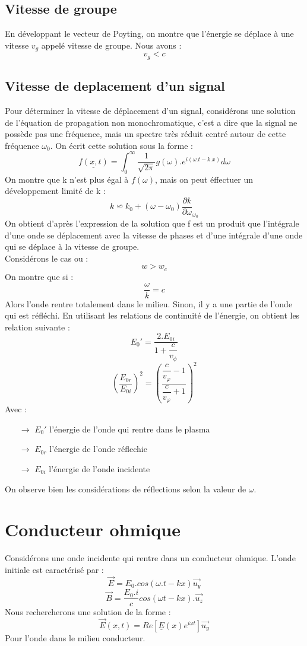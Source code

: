 \subsection{Vitesse de groupe}
En développant le vecteur de Poyting, on montre que l'énergie se déplace à une vitesse $v_g$ appelé vitesse de groupe. Nous avons : 
$$v_g < c$$
\subsection{Vitesse de deplacement d'un signal}
Pour déterminer la vitesse de déplacement d'un signal, considérons une solution de l'équation de propagation non monochromatique, c'est a dire que la signal ne possède pas une fréquence, mais un spectre très réduit centré autour de cette fréquence $\omega_0$. On écrit cette solution sous la forme : 
$$\underline{f(x,t)} = \int_0^{\infty} \dfrac{1}{\sqrt{2\pi}} g(\omega).e^{i(\omega.t-k.x)}d\omega $$
On montre que k n'est plus égal à $f(\omega)$, mais on peut éffectuer un développement limité de k : 
$$k \backsimeq k_0 + (\omega - \omega_0)\dfrac{\partial k}{\partial \omega}_{\omega_0}$$ 
On obtient d'après l'expression de la solution que f est un produit que l'intégrale d'une onde se déplacement avec la vitesse de phases et d'une intégrale d'une onde qui se déplace à la vitesse de groupe.\\
Considérons le cas ou : 
$$w > w_c$$
On montre que si :
$$\dfrac{\omega}{k} = c$$
Alors l'onde rentre totalement dans le milieu. Sinon, il y a une partie de l'onde qui est réfléchi. En utilisant les relations de continuité de l'énergie, on obtient les relation suivante :
$$E_0' = \dfrac{2.E_{0i}}{1 + \dfrac{c}{v_{\phi}}}$$
$$\left(\dfrac{E_{0r}}{E_{0i}}\right)^2 = \left(\dfrac{\dfrac{c}{v_{\varphi}} - 1}{\dfrac{c}{v_{\varphi}} + 1}\right)^2$$
Avec : 
\begin{itemize}
 \item[$\rightarrow$] $E_0'$ l'énergie de l'onde qui rentre dans le plasma
 \item[$\rightarrow$] $E_{0r}$ l'énergie de l'onde réflechie
 \item[$\rightarrow$] $E_{0i}$ l'énergie de l'onde incidente
\end{itemize}
On observe bien les considérations de réflections selon la valeur de $\omega$.
\section{Conducteur ohmique}
Considérons une onde incidente qui rentre dans un conducteur ohmique. L'onde initiale est caractérisé par : 
$$\overrightarrow{E} = E_0.cos(\omega.t-kx)\overrightarrow{u_y}$$
$$\overrightarrow{B} = \dfrac{E_0.i}{c} cos(\omega t-kx).\overrightarrow{u_z}$$
Nous rechercherons une solution de la forme : 
$$\overrightarrow{E}(x,t) = Re[\underline{E}(x)e^{i\omega t}]\overrightarrow{u_y}$$
Pour l'onde dans le milieu conducteur.
